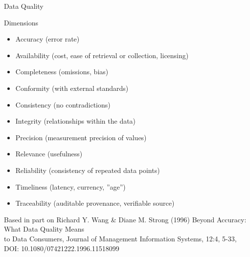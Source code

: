 \documentclass[ignorenonframetext,xcolor=x11names]{beamer}
\begin{document}
\begin{frame}[label=full]{Data Quality}
\begin{block}{Dimensions}
\begin{itemize}
	\item Accuracy (error rate)
	\item Availability (cost, ease of retrieval or collection, licensing)
	\item Completeness (omissions, bias)
	\item Conformity (with external standards)
	\item Consistency (no contradictions)
	\item Integrity (relationships within the data)
	\item Precision (measurement precision of values)
	\item Relevance (usefulness)
	\item Reliability (consistency of repeated data points)
	\item Timeliness (latency, currency, ''age'')
	\item Traceability (auditable provenance, verifiable source)
\end{itemize}
\end{block}
\tiny{Based in part on Richard Y. Wang \& Diane M. Strong (1996) Beyond Accuracy: What Data Quality Means \\ to Data Consumers, Journal of Management Information Systems, 12:4, 5-33, \\ DOI: 10.1080/07421222.1996.11518099 }
\end{frame}
\end{document}

